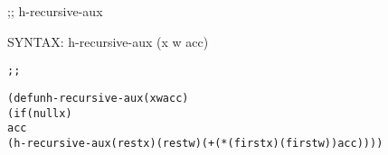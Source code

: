 \begin{aibox}{\function}
;; h-recursive-aux

SYNTAX: h-recursive-aux (x w acc)
\end{aibox}

\begin{aibox}{\examples}
\begin{alltt}
\end{alltt}

\end{aibox}

\begin{aibox}{\comments}

\end{aibox}
\begin{aibox}{\answers}

\end{aibox}
\begin{aibox}{\othercomments}

\end{aibox}
\begin{aibox}{\pseudocode}

\end{aibox}
\begin{aibox}{\code}

\begin{alltt}
;;%% code

(defun h-recursive-aux (x w acc)
        (if (null x)
            acc
        (h-recursive-aux (rest x) (rest w) ( + (* (first x)  (first w)) acc))))
\end{alltt}
\end{aibox}
